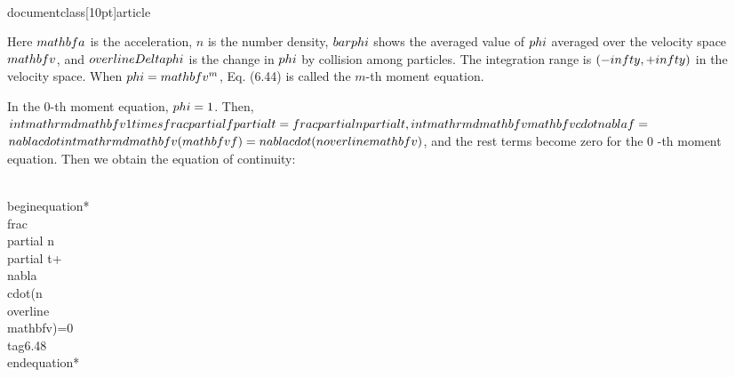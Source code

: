 \\documentclass[10pt]{article}
\begin{document}
{{{{Here $\\mathbf{a}$ is the acceleration, $n$ is the number density, $\\bar{\\phi}$ shows the averaged value of $\\phi$ averaged over the velocity space $\\mathbf{v}$, and $\\overline{\\Delta \\phi}$ is the change in $\\phi$ by collision among particles. The integration range is $(-\\infty,+\\infty)$ in the velocity space. When $\\phi=\\mathbf{v}^{m}$, Eq. (6.44) is called the $m$-th moment equation.

In the 0-th moment equation, $\\phi=1$. Then, $\\int \\mathrm{d} \\mathbf{v} 1 \\times \\frac{\\partial f}{\\partial t}=\\frac{\\partial n}{\\partial t}, \\int \\mathrm{d} \\mathbf{v} \\mathbf{v} \\cdot \\nabla f=$ $\\nabla \\cdot \\int \\mathrm{d} \\mathbf{v}(\\mathbf{v} f)=\\nabla \\cdot(n \\overline{\\mathbf{v}})$, and the rest terms become zero for the 0 -th moment equation. Then we obtain the equation of continuity:


\\begin{equation*}
\\frac{\\partial n}{\\partial t}+\\nabla \\cdot(n \\overline{\\mathbf{v}})=0 \\tag{6.48}
\\end{equation*}


}}}}
\end{document}
